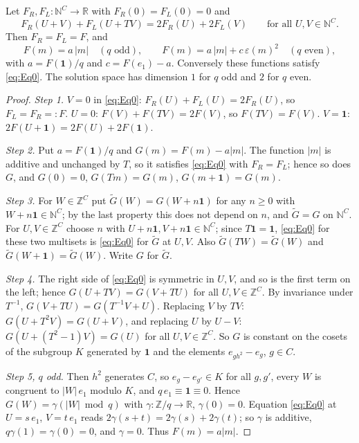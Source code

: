 \begin{proposition}\label{prop:solveq}
Let $F_R,F_L\colon\mathbb{N}^C\to\mathbb{R}$ with $F_R(0)=F_L(0)=0$ and
\begin{equation}\label{eq:Eq0}
F_R(U+V)+F_L(U+TV)=2F_R(U)+2F_L(V)\qquad\text{for all }U,V\in\mathbb{N}^C .
\end{equation}
Then $F_R=F_L=F$, and
\[
F(m)=a\,|m|\quad(q\text{ odd}),\qquad F(m)=a\,|m|+c\,\varepsilon(m)^2\quad(q\text{ even}),
\]
with $a=F(\mathbf{1})/q$ and $c=F(e_1)-a$. Conversely these functions satisfy \eqref{eq:Eq0}. The solution space has dimension $1$ for $q$ odd and $2$ for $q$ even.
\end{proposition}
\begin{proof}
\emph{Step 1.} $V=0$ in \eqref{eq:Eq0}: $F_R(U)+F_L(U)=2F_R(U)$, so $F_L=F_R=:F$. $U=0$: $F(V)+F(TV)=2F(V)$, so $F(TV)=F(V)$. $V=\mathbf{1}$: $2F(U+\mathbf{1})=2F(U)+2F(\mathbf{1})$.

\emph{Step 2.} Put $a=F(\mathbf{1})/q$ and $G(m)=F(m)-a|m|$. The function $|m|$ is additive and unchanged by $T$, so it satisfies \eqref{eq:Eq0} with $F_R=F_L$; hence so does $G$, and $G(0)=0$, $G(Tm)=G(m)$, $G(m+\mathbf{1})=G(m)$.

\emph{Step 3.} For $W\in\mathbb{Z}^C$ put $\tilde G(W)=G(W+n\mathbf{1})$ for any $n\ge0$ with $W+n\mathbf{1}\in\mathbb{N}^C$; by the last property this does not depend on $n$, and $\tilde G=G$ on $\mathbb{N}^C$. For $U,V\in\mathbb{Z}^C$ choose $n$ with $U+n\mathbf{1},V+n\mathbf{1}\in\mathbb{N}^C$; since $T\mathbf{1}=\mathbf{1}$, \eqref{eq:Eq0} for these two multisets is \eqref{eq:Eq0} for $\tilde G$ at $U,V$. Also $\tilde G(TW)=\tilde G(W)$ and $\tilde G(W+\mathbf{1})=\tilde G(W)$. Write $G$ for $\tilde G$.

\emph{Step 4.} The right side of \eqref{eq:Eq0} is symmetric in $U,V$, and so is the first term on the left; hence $G(U+TV)=G(V+TU)$ for all $U,V\in\mathbb{Z}^C$. By invariance under $T^{-1}$, $G(V+TU)=G(T^{-1}V+U)$. Replacing $V$ by $TV$: $G(U+T^2V)=G(U+V)$, and replacing $U$ by $U-V$: $G(U+(T^2-1)V)=G(U)$ for all $U,V\in\mathbb{Z}^C$. So $G$ is constant on the cosets of the subgroup $K$ generated by $\mathbf{1}$ and the elements $e_{gh^2}-e_g$, $g\in C$.

\emph{Step 5, $q$ odd.} Then $h^2$ generates $C$, so $e_g-e_{g'}\in K$ for all $g,g'$, every $W$ is congruent to $|W|\,e_1$ modulo $K$, and $q\,e_1\equiv\mathbf{1}\equiv0$. Hence $G(W)=\gamma(|W|\bmod q)$ with $\gamma\colon\mathbb{Z}/q\to\mathbb{R}$, $\gamma(0)=0$. Equation \eqref{eq:Eq0} at $U=s\,e_1$, $V=t\,e_1$ reads $2\gamma(s+t)=2\gamma(s)+2\gamma(t)$; so $\gamma$ is additive, $q\gamma(1)=\gamma(0)=0$, and $\gamma=0$. Thus $F(m)=a|m|$.


\end{proof}
